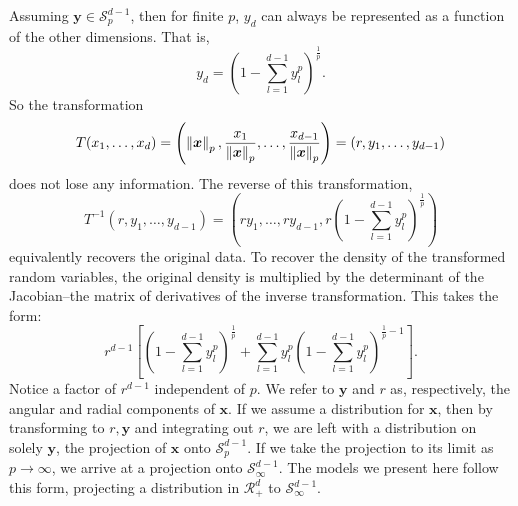 Assuming $\bm{y} \in \mathcal{S}_{p}^{d-1}$, then for finite $p$, $y_d$ can always be represented
  as a function of the other dimensions.  That is,
  \begin{equation*}
    y_d = \left(1 - \sum_{l = 1}^{d-1}y_l^p\right)^{\frac{1}{p}}.
  \end{equation*}
  So the transformation
  \begin{equation}
    \label{eqn:pnormt}
    T(x_1,\ldots,x_d) = \left(\left\lVert \bm{x} \right\rVert_{p}, \frac{x_1}{\left\lVert \bm{x} \right\rVert_{p}},
                          \ldots , \frac{x_{d-1}}{\left\lVert \bm{x} \right\rVert_{p}}\right) = (r,y_1,\ldots,y_{d-1})
  \end{equation}
  does not lose any information.  The reverse of this transformation,
  \begin{equation}
    \label{eqn:pnormtinv}
    T^{-1}\left(r,y_1,\ldots,y_{d-1}\right) =
      \left(ry_1,\ldots,ry_{d-1}, r\left(1 - {\scriptstyle\sum}_{l = 1}^{d-1}y_l^p\right)^{\frac{1}{p}}\right)
  \end{equation}
  equivalently recovers the original data.  To recover the density of the transformed random variables,
  the original density is multiplied by the determinant of the Jacobian--the matrix of derivatives
  of the inverse transformation.  This takes the form:
  \begin{equation}
    \label{eqn:pnormjac}
    r^{d-1}\left[\left(1 - \sum_{l = 1}^{d-1}y_l^p\right)^{\frac{1}{p}} +
        \sum_{l = 1}^{d-1}y_l^p\left(1 - \sum_{l=1}^{d-1} y_l^p\right)^{\frac{1}{p} - 1}\right].
  \end{equation}
  Notice a factor of $r^{d-1}$ independent of $p$. We refer to $\bm{y}$ and $r$ as, respectively,
  the angular and radial components of $\bm{x}$.  If we assume a distribution for $\bm{x}$, then
  by transforming to $r, \bm{y}$ and integrating out $r$, we are left with a distribution on solely
  $\bm{y}$, the projection of $\bm{x}$ onto $\mathcal{S}_{p}^{d-1}$.  If we take the projection to
  its limit as $p\to\infty$, we arrive at a projection onto $\mathcal{S}_{\infty}^{d-1}$.  The models
  we present here follow this form, projecting a distribution in $\mathcal{R}_+^{d}$ to
  $\mathcal{S}_{\infty}^{d-1}$.
%
%

